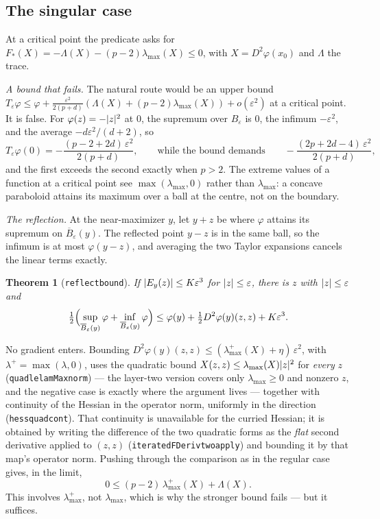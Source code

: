 \documentclass[11pt,reqno]{amsart}
\newcommand{\LEANREF}[1]{\texttt{\small\def\_{\textunderscore\allowbreak}#1}}
\newcommand{\eps}{\varepsilon}
\newcommand{\Op}{T_\eps}
\DeclarePairedDelimiter{\abs}{\lvert}{\rvert}
\theoremstyle{plain}
\newtheorem{theorem}{Theorem}[section]
\theoremstyle{definition}
\begin{document}
\subsection{The singular case}\label{ssec:singular}

At a critical point the predicate asks for
$F_*(X) = -\Lambda(X) - (p-2)\lambda_{\max}(X) \le 0$, with
$X = D^2\varphi(x_0)$ and $\Lambda$ the trace.

\emph{A bound that fails.} The natural route would be an upper bound
$\Op\varphi \le \varphi + \frac{\eps^2}{2(p+d)}(\Lambda(X) + (p-2)\lambda_{\max}(X)) + o(\eps^2)$
at a critical point. It is false. For $\varphi(z) = -\abs{z}^2$ at $0$, the
supremum over $B_\eps$ is $0$, the infimum $-\eps^2$, and the average
$-d\eps^2/(d+2)$, so
\[
  \Op\varphi(0) = -\frac{(p - 2 + 2d)\,\eps^2}{2(p+d)},
  \qquad\text{while the bound demands}\qquad
  -\frac{(2p + 2d - 4)\,\eps^2}{2(p+d)},
\]
and the first exceeds the second exactly when $p > 2$. The extreme values of a
function at a critical point see $\max(\lambda_{\max}, 0)$ rather than
$\lambda_{\max}$: a concave paraboloid attains its maximum over a ball at the
centre, not on the boundary.

\emph{The reflection.} At the near-maximizer $y$, let $y + z$ be where $\varphi$
attains its supremum on $\overline{B}_\eps(y)$. The reflected point $y - z$ is
in the same ball, so the infimum is at most $\varphi(y - z)$, and averaging the
two Taylor expansions cancels the linear terms exactly.

\begin{theorem}[\LEANREF{reflect\_bound}]\label{thm:reflect}
If $\abs{E_y(z)} \le K\eps^3$ for $\abs{z} \le \eps$, there is $z$ with
$\abs{z} \le \eps$ and
\[
  \tfrac12\Bigl(\sup_{\overline{B}_\eps(y)}\varphi + \inf_{\overline{B}_\eps(y)}\varphi\Bigr)
  \le \varphi(y) + \tfrac12 D^2\varphi(y)(z,z) + K\eps^3 .
\]
\end{theorem}

No gradient enters. Bounding
$D^2\varphi(y)(z,z) \le (\lambda_{\max}^+(X) + \eta)\,\eps^2$, with
$\lambda^+ = \max(\lambda, 0)$, uses the quadratic bound
$X(z,z) \le \lambda_{\max}(X)\abs{z}^2$ for \emph{every} $z$
(\LEANREF{quad\_le\_lamMax\_norm}) --- the layer-two version covers only
$\lambda_{\max} \ge 0$ and nonzero $z$, and the negative case is exactly where
the argument lives --- together with continuity of the Hessian in the operator
norm, uniformly in the direction (\LEANREF{hess\_quad\_cont}). That continuity
is unavailable for the curried Hessian; it is obtained by writing the
difference of the two quadratic forms as the \emph{flat} second derivative
applied to $(z,z)$ (\LEANREF{iteratedFDeriv\_two\_apply}) and bounding it by
that map's operator norm. Pushing through the comparison as in the regular case
gives, in the limit,
\[
  0 \le (p-2)\,\lambda_{\max}^+(X) + \Lambda(X).
\]
This involves $\lambda_{\max}^+$, not $\lambda_{\max}$, which is why the
stronger bound fails --- but it suffices.
\end{document}
